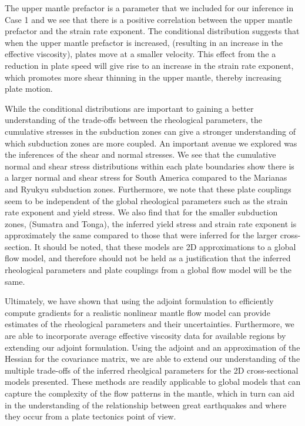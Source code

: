 \documentclass[12pt]{article}
\begin{document}
The upper mantle prefactor is a parameter that we included for our inference in Case 1 and we see that there is a positive correlation between the upper mantle prefactor and the strain rate exponent. The conditional distribution suggests that when the upper mantle prefactor is increased, (resulting in an increase in the effective viscosity), plates move at a smaller velocity. This  effect from the a reduction in plate speed will give rise to an increase in the strain rate exponent, which promotes more shear thinning in the upper mantle, thereby increasing plate motion.


While the conditional distributions are important to gaining a better understanding of the trade-offs between the rheological parameters, the cumulative stresses in the subduction zones can give a stronger understanding of which subduction zones are more coupled. An important avenue we explored was the inferences of the shear and normal stresses. We see that the cumulative normal and shear stress distributions within each plate boundaries show there is a larger normal and shear stress for South America compared to the Marianas and Ryukyu subduction zones. Furthermore, we note that these plate couplings seem to be independent of the global rheological parameters such as the strain rate exponent and yield stress.  We also find that for the smaller subduction zones, (Sumatra and Tonga), the inferred yield stress and strain rate exponent is approximately the same compared to those that were inferred for the larger cross-section. It should be noted, that these models are 2D approximations to a global flow model, and therefore should not be held as a justification that the inferred rheological parameters and plate couplings from a global flow model will be the same.

Ultimately, we have shown that using the adjoint formulation to efficiently compute gradients for a realistic nonlinear mantle flow model can provide estimates of the rheological parameters and their uncertainties. Furthermore, we are able to incorporate average effective viscosity data for available regions by extending our adjoint formulation. Using the adjoint and an approximation of the Hessian for the covariance matrix, we are able to extend our understanding of the multiple trade-offs of the inferred rheolgical parameters for the 2D cross-sectional models presented. These methods are readily applicable to global models that can capture the complexity of the flow patterns in the mantle, which in turn can aid in the understanding of the relationship between great earthquakes and where they occur from a plate tectonics point of view.




\end{document}
